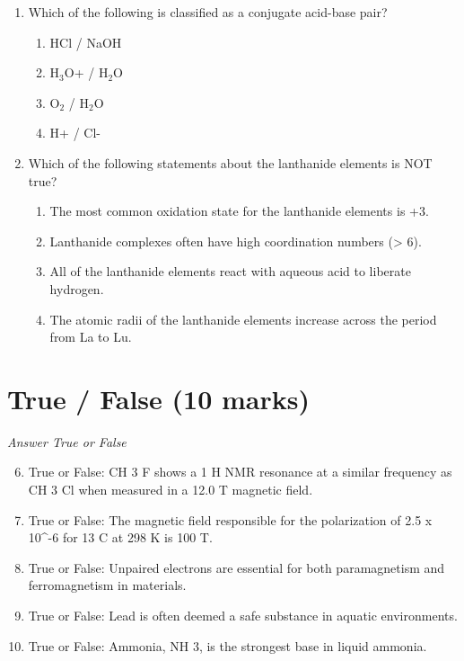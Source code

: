 \documentclass[12pt]{article}
\begin{document}
\begin{enumerate}[label=\arabic*.]
\begin{enumerate}[label=(\alph*)]
\end{enumerate}
\item Which of the following is classified as a conjugate acid-base pair?
\begin{enumerate}[label=(\alph*)]
    \item HCl / NaOH
    \item H$_{3}$O+ / H$_{2}$O
    \item O$_{2}$ / H$_{2}$O
    \item H+ / Cl-
\end{enumerate}
\item Which of the following statements about the lanthanide elements is NOT true?
\begin{enumerate}[label=(\alph*)]
    \item The most common oxidation state for the lanthanide elements is +3.
    \item Lanthanide complexes often have high coordination numbers (\textgreater{} 6).
    \item All of the lanthanide elements react with aqueous acid to liberate hydrogen.
    \item The atomic radii of the lanthanide elements increase across the period from La to Lu.
\end{enumerate}
\end{enumerate}

\section*{True / False (10 marks)}
\textit{Answer True or False}
\begin{enumerate}[label=\arabic*.]
\setcounter{enumi}{5}
\item True or False: CH 3 F shows a 1 H NMR resonance at a similar frequency as CH 3 Cl when measured in a 12.0 T magnetic field.
\item True or False: The magnetic field responsible for the polarization of 2.5 x 10^-6 for 13 C at 298 K is 100 T.
\item True or False: Unpaired electrons are essential for both paramagnetism and ferromagnetism in materials.
\item True or False: Lead is often deemed a safe substance in aquatic environments.
\item True or False: Ammonia, NH 3, is the strongest base in liquid ammonia.
\end{enumerate}
\end{document}
